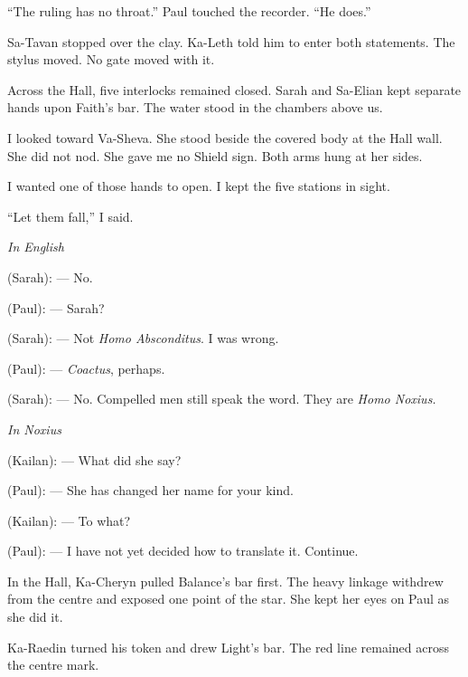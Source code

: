 ``The ruling has no throat.'' Paul touched the recorder. ``He does.''\par

Sa-Tavan stopped over the clay. Ka-Leth told him to enter both statements. The stylus moved. No gate moved with it.\par

Across the Hall, five interlocks remained closed. Sarah and Sa-Elian kept separate hands upon Faith's bar. The water stood in the chambers above us.\par

I looked toward Va-Sheva. She stood beside the covered body at the Hall wall. She did not nod. She gave me no Shield sign. Both arms hung at her sides.\par

I wanted one of those hands to open. I kept the five stations in sight.\par

``Let them fall,'' I said.\par


\begin{room}

\textit{In English}

(Sarah): --- No.

(Paul): --- Sarah?

(Sarah): --- Not \textit{Homo Absconditus}. I was wrong.

(Paul): --- \textit{Coactus}, perhaps.

(Sarah): --- No. Compelled men still speak the word. They are \textit{Homo Noxius.}

\textit{In Noxius}

(Kailan): --- What did she say?

(Paul): --- She has changed her name for your kind.

(Kailan): --- To what?

(Paul): --- I have not yet decided how to translate it. Continue.

\end{room}

\ornament

In the Hall, Ka-Cheryn pulled Balance's bar first. The heavy linkage withdrew from the centre and exposed one point of the star. She kept her eyes on Paul as she did it.\par

Ka-Raedin turned his token and drew Light's bar. The red line remained across the centre mark.\par

